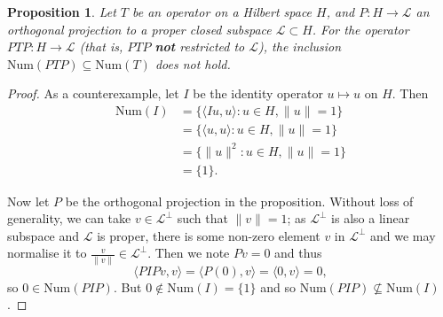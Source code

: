 \documentclass[a5paper]{article}
\newtheorem*{proposition}{Proposition}
\newcommand{\Num}{\text{Num}}
\begin{document}
\begin{proposition}
Let $T$ be an operator on a Hilbert space $H$, and $P: H \rightarrow \mathcal{L}$ an orthogonal projection
to a proper closed subspace $\mathcal{L} \subset H$. For the operator $PTP: H \rightarrow \mathcal{L}$ (that
is, $PTP$ \textbf{not} restricted to $\mathcal{L}$), the inclusion $\Num(PTP) \subseteq \Num(T)$ does not hold.
\end{proposition}
\begin{proof}

As a counterexample, let $I$ be the identity operator $u \mapsto u$ on $H$. Then
\begin{equation*}
\begin{split}
\Num(I)  & = \{\langle Iu, u \rangle : u \in H, \|u\| = 1\} \\
& =  \{\langle u, u \rangle : u \in H, \|u\| = 1\} \\
& =  \{\|u\|^2 : u \in H, \|u\| = 1\} \\
& = \{1\}.
\end{split}
\end{equation*}

Now let $P$ be the orthogonal projection in the proposition.
Without loss of generality, we can take $v \in \mathcal{L}^\perp$ such that $\|v\| = 1$; as $\mathcal{L}^\perp$ is also a linear subspace and $\mathcal{L}$ is proper, there is some non-zero element $v$ in $\mathcal{L}^\perp$ and
we may normalise it to $\frac{v}{\|v\|} \in \mathcal{L}^\perp$. Then we note $Pv = 0$ and thus
$$\langle PIPv, v \rangle = \langle P(0), v \rangle =  \langle 0, v \rangle = 0,$$ 
so $0 \in \Num(PIP)$. But $0 \notin \Num(I) = \{1\}$ and so $\Num(PIP) \nsubseteq \Num(I)$.

\end{proof}
\end{document}
